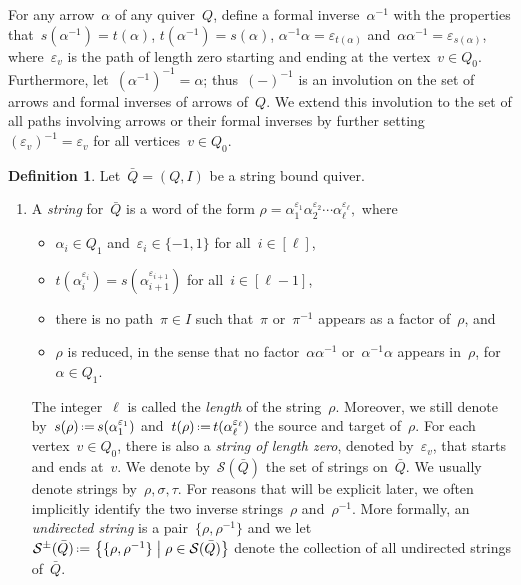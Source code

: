 \documentclass{amsart}
\theoremstyle{definition}
\newtheorem{definition}[theorem]{Definition}
\newcommand{\set}[2]{\left\{ #1 \;\middle|\; #2 \right\}} %
\newcommand{\eqdef}{\mbox{\,\raisebox{0.2ex}{\scriptsize\ensuremath{\mathrm:}}\ensuremath{=}\,}} %
\newcommand{\darkblue}{\color{darkblue}} %
\newcommand{\defn}[1]{\textsl{\darkblue #1}} %
\newcommand{\strings}{\mathcal{S}} %
\begin{document}
For any arrow~$\alpha$ of any quiver~$Q$, define a formal inverse~$\alpha^{-1}$ with the properties that~$s(\alpha^{-1}) = t(\alpha)$, $t(\alpha^{-1}) = s(\alpha)$, $\alpha^{-1}\alpha = \varepsilon_{t(\alpha)}$ and~$\alpha\alpha^{-1} = \varepsilon_{s(\alpha)}$, where~$\varepsilon_v$ is the path of length zero starting and ending at the vertex~$v \in Q_0$.  Furthermore, let~$(\alpha^{-1})^{-1}=\alpha$; thus~$(-)^{-1}$ is an involution on the set of arrows and formal inverses of arrows of~$Q$.  We extend this involution to the set of all paths involving arrows or their formal inverses by further setting~$(\varepsilon_v)^{-1} = \varepsilon_v$ for all vertices~$v \in Q_0$.

\begin{definition}
\label{def:stringsBands}
Let~$\bar Q = (Q,I)$ be a string bound quiver.
\begin{enumerate}
\item A \defn{string} for~$\bar Q$ is a word of the form
\(
\rho = \alpha_1^{\varepsilon_1}\alpha_2^{\varepsilon_2}\cdots \alpha_\ell^{\varepsilon_\ell},
\)
where
	\begin{itemize}
	\item $\alpha_i \in Q_1$ and~$\varepsilon_i \in \{-1,1\}$ for all~$i \in [\ell]$,
	\item $t(\alpha_i^{\varepsilon_i}) = s(\alpha_{i+1}^{\varepsilon_{i+1}})$ for all~$i \in [\ell-1]$,
	\item there is no path~$\pi \in I$ such that~$\pi$ or~$\pi^{-1}$ appears as a factor of~$\rho$, and
	\item $\rho$ is reduced, in the sense that no factor~$\alpha\alpha^{-1}$ or~$\alpha^{-1}\alpha$ appears in~$\rho$, for~$\alpha \in Q_1$.
	\end{itemize}
The integer~$\ell$ is called the \defn{length} of the string~$\rho$.
Moreover, we still denote by~$s(\rho) \eqdef s(\alpha_1^{\varepsilon_1})$ and~$t(\rho) \eqdef t(\alpha_\ell^{\varepsilon_\ell})$ the source and target of~$\rho$.
For each vertex~$v \in Q_0$, there is also a \defn{string of length zero}, denoted by~$\varepsilon_v$, that starts and ends at~$v$.
We denote by~$\strings(\bar Q)$ the set of strings on~$\bar Q$.
We usually denote strings by~$\rho, \sigma, \tau$.
For reasons that will be explicit later, we often implicitly identify the two inverse strings~$\rho$ and~$\rho^{-1}$.
More formally, an \defn{undirected string} is a pair~$\{\rho, \rho^{-1}\}$ and we let~$\strings^\pm(\bar Q) \eqdef \set{\{\rho, \rho^{-1}\}}{\rho \in \strings(\bar Q)}$ denote the collection of all undirected strings of~$\bar Q$.


\end{enumerate}
\end{definition}
\end{document}
